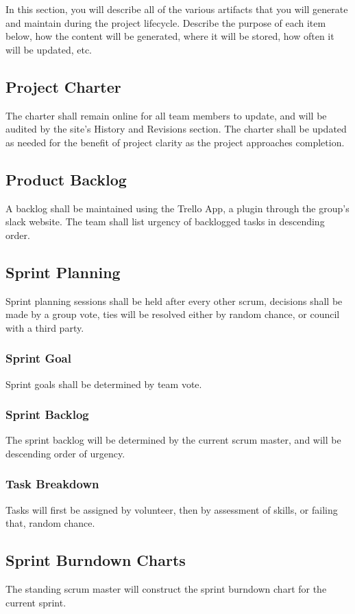 In this section, you will describe all of the various artifacts that you will generate and maintain during the project lifecycle. Describe the purpose of each item below, how the content will be generated, where it will be stored, how often it will be updated, etc. 

\subsection{Project Charter}
The charter shall remain online for all team members to update, and will be audited by the site's History and Revisions section. The charter shall be updated as needed for the benefit of project clarity as the project approaches completion.

\subsection{Product Backlog}
A backlog shall be maintained using the Trello App, a plugin through the group's slack website. The team shall
list urgency of backlogged tasks in descending order.

\subsection{Sprint Planning}
Sprint planning sessions shall be held after every other scrum, decisions shall be made by a group vote, ties will be resolved either by random chance, or council with a third party.

\subsubsection{Sprint Goal}
Sprint goals shall be determined by team vote.

\subsubsection{Sprint Backlog}
The sprint backlog will be determined by the current scrum master, and will be descending order of urgency.

\subsubsection{Task Breakdown}
Tasks will first be assigned by volunteer, then by assessment of skills, or failing that, random chance.

\subsection{Sprint Burndown Charts}
The standing scrum master will construct the sprint burndown chart for the current sprint.

